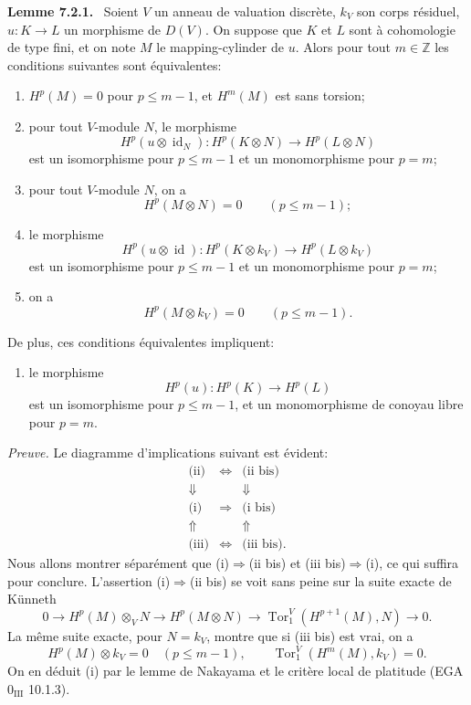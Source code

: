 \documentclass[11pt]{article}
\newenvironment{statement}[1]{\par\medskip\noindent\textbf{#1.}\ }{\par\medskip}
\begin{document}
\begin{statement}{Lemme 7.2.1}
Soient $V$ un anneau de valuation discrète, $k_V$ son corps résiduel, $u:K\to L$ un morphisme de $D(V)$. On suppose que $K$ et $L$ sont à cohomologie de type fini, et on note $M$ le mapping-cylinder de $u$. Alors pour tout $m\in\mathbb Z$ les conditions suivantes sont équivalentes:
\begin{enumerate}[label=(\roman*)]
\item $H^p(M)=0$ pour $p\le m-1$, et $H^m(M)$ est sans torsion;
\item pour tout $V$-module $N$, le morphisme
\[
H^p(u\otimes\operatorname{id}_N):H^p(K\otimes N)\to H^p(L\otimes N)
\]
est un isomorphisme pour $p\le m-1$ et un monomorphisme pour $p=m$;
\item[(ii bis)] pour tout $V$-module $N$, on a
\[
H^p(M\otimes N)=0\qquad(p\le m-1);
\]
\item le morphisme
\[
H^p(u\otimes\operatorname{id}):H^p(K\otimes k_V)\to H^p(L\otimes k_V)
\]
est un isomorphisme pour $p\le m-1$ et un monomorphisme pour $p=m$;
\item[(iii bis)] on a
\[
H^p(M\otimes k_V)=0\qquad(p\le m-1).
\]
\end{enumerate}
De plus, ces conditions équivalentes impliquent:
\begin{enumerate}[label=(\roman* bis)]
\item le morphisme
\[
H^p(u):H^p(K)\to H^p(L)
\]
est un isomorphisme pour $p\le m-1$, et un monomorphisme de conoyau libre pour $p=m$.
\end{enumerate}
\end{statement}

\emph{Preuve.} Le diagramme d'implications suivant est évident:
\[
\begin{array}{ccc}
\text{(ii)}&\Leftrightarrow&\text{(ii bis)}\\
\Downarrow&&\Downarrow\\
\text{(i)}&\Rightarrow&\text{(i bis)}\\
\Uparrow&&\Uparrow\\
\text{(iii)}&\Leftrightarrow&\text{(iii bis).}
\end{array}
\]
Nous allons montrer séparément que (i)$\Rightarrow$(ii bis) et (iii bis)$\Rightarrow$(i), ce qui suffira pour conclure. L'assertion (i)$\Rightarrow$(ii bis) se voit sans peine sur la suite exacte de Künneth
\[
0\to H^p(M)\otimes_V N\to H^p(M\otimes N)\to \operatorname{Tor}_1^V(H^{p+1}(M),N)\to0.
\]
La même suite exacte, pour $N=k_V$, montre que si (iii bis) est vrai, on a
\[
H^p(M)\otimes k_V=0\quad(p\le m-1),\qquad
\operatorname{Tor}_1^V(H^m(M),k_V)=0.
\]
On en déduit (i) par le lemme de Nakayama et le critère local de platitude (EGA $0_{\mathrm{III}}$ 10.1.3).
\end{document}
